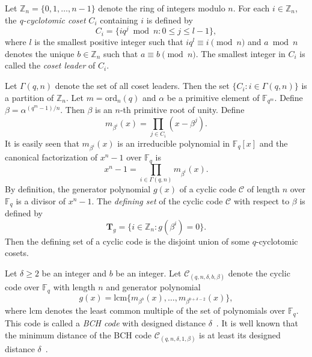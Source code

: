 \documentclass[journal,12pt,onecolumn]{IEEEtran}
\begin{document}
Let $\mathbb{Z}_n=\{0,1,\dots,n-1\}$ denote the ring of integers modulo $n$. For each $i\in \mathbb{Z}_n$, the \textit{q-cyclotomic coset} $C_i$ containing $i$ is defined by
\[C_i=\{iq^j\bmod  n:0\le j\le l-1\},\]
where $l$ is the smallest positive integer such that $iq^l\equiv i\pmod n$ and $a \bmod n$ denotes the unique $b\in \mathbb{Z}_n$ such that $a\equiv b\pmod n$. The smallest integer in $C_i$ is called the \textit{coset leader} of $C_i$.

Let $\Gamma(q,n)$ denote the set of all coset leaders. Then the set $\{C_i:i\in \Gamma(q,n)\}$ is a partition of $\mathbb{Z}_n$. Let $m=\mathrm{ord}_n(q)$ and $\alpha$ be a primitive element of $\mathbb{F}_{q^m}$. Define $\beta=\alpha^{(q^m-1)/n}$. Then $\beta$ is an $n$-th primitive root of unity. Define 
\[m_{\beta^i}(x)=\prod\limits_{j\in C_i} (x-\beta^j).\]
It is easily seen that $m_{\beta^i}(x)$ is an irreducible polynomial in $\mathbb{F}_q[x]$ and the canonical factorization of $x^n-1$ over $\mathbb{F}_q$ is 
\[x^n-1=\prod\limits_{i\in \Gamma(q,n)}m_{\beta^i}(x).\]
By definition, the generator polynomial $g(x)$ of a cyclic code $\mathcal{C}$ of length $n$ over $\mathbb{F}_q$ is a divisor of $x^n-1$. The \textit{defining set} of the cyclic code $\mathcal{C}$ with respect to $\beta$ is defined by 
\[\textbf{T}_g=\{i\in \mathbb{Z}_n:g(\beta^i)=0\}.\]
Then the defining set of a cyclic code is the disjoint union of some $q$-cyclotomic cosets.

Let $\delta\ge 2$ be an integer and $b$ be an integer. Let $\mathcal{C}_{(q,n,\delta,b,\beta)}$ denote the cyclic code over $\mathbb{F}_q$ with length $n$ and generator polynomial \[g(x)=\text{lcm}\{m_{\beta^b}(x),\dots,m_{\beta^{b+\delta-2}}(x)\},\]
where $\text{lcm}$ denotes the least common multiple of the set of polynomials over $\mathbb{F}_q$.  This code is called a \textit{BCH code} with designed distance $\delta$~\cite{huffman2003fundamentals}. It is well known that the minimum distance of the BCH code $\mathcal{C}_{(q,n,\delta,1,\beta)}$ is at least its designed distance $\delta$~\cite{Blahut2003Algebraic}. 
\end{document}

